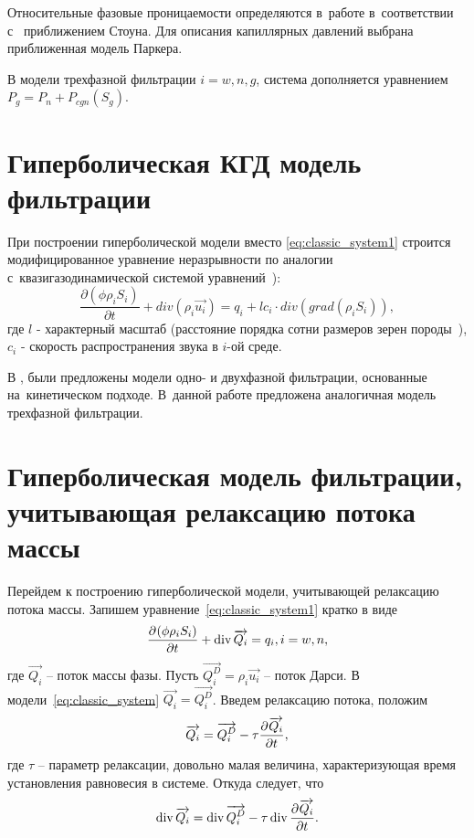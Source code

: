 Относительные фазовые проницаемости определяются в~работе в~соответствии с~
приближением Стоуна\cite{Aziz-Settari}.
Для описания капиллярных давлений выбрана приближенная модель Паркера\cite{Parker}.

В модели трехфазной фильтрации $i = w,n,g$, система дополняется уравнением $P_g = P_n + P_{cgn}({S}_g)$.

\section{Гиперболическая КГД модель фильтрации} \label{sec:ch1/sec2}

При построении гиперболической модели вместо \eqref{eq:classic_system1} строится модифицированное уравнение неразрывности по аналогии с~квазигазодинамической системой уравнений~\cite{Chetverushkin-Mathmod}):
\begin{equation}
 \label{mass_mod}
  \frac{\partial (\phi \rho_i S_i)}{\partial t}+ div(\rho_i \overrightarrow{u_i}) = q_i + l c_i \cdot div(grad(\rho_i S_i)),
\end{equation}
где $l$ - характерный масштаб (расстояние порядка сотни размеров зерен породы~\cite{Chetverushkin}),
$c_i$ - скорость распространения звука в $i$-ой среде.

В \cite{Mathmod-2010},\cite{Mathmod-2011} были предложены модели одно- и двухфазной фильтрации, основанные на~кинетическом подходе. В~данной работе предложена аналогичная модель трехфазной фильтрации.

\section{Гиперболическая модель фильтрации, учитывающая релаксацию потока массы} \label{sec:ch1/sec3}

Перейдем к построению гиперболической модели, учитывающей релаксацию потока массы. 
Запишем уравнение~\eqref{eq:classic_system1} кратко в виде
\begin{equation} \label{eq:short_system}
   \dfrac{\partial^{} (\phi \rho_i S_i)}{\partial t^{}} + \mathop{\mathrm{div}}\nolimits{ \overrightarrow{Q_i}} = q_i, i = w,n,
\end{equation}
где $\overrightarrow{Q_i}$ -- поток массы фазы.
Пусть $\overrightarrow{Q_i^D} = \rho_i \overrightarrow{u_i}$ -- поток Дарси.
В модели~\eqref{eq:classic_system} $\overrightarrow{Q_i} = \overrightarrow{Q_i^D}$.
Введем релаксацию потока, положим
\begin{equation}
 \overrightarrow{Q_i} = \overrightarrow{Q_i^D} - \tau \dfrac{\partial^{} \overrightarrow{Q_i}}{\partial t^{}},
\end{equation}
где $\tau$ -- параметр релаксации, довольно малая величина, характеризующая время установления равновесия в системе. Откуда следует, что
\begin{equation} \label{eq:div_relax}
 \mathop{\mathrm{div}}\nolimits{\overrightarrow{Q_i}} = \mathop{\mathrm{div}}\nolimits{\overrightarrow{Q_i^D}} - \tau \mathop{\mathrm{div}}\nolimits{\ensuremath{\dfrac{\partial^{} \overrightarrow{Q_i}}{\partial t^{}}}}.
\end{equation}

